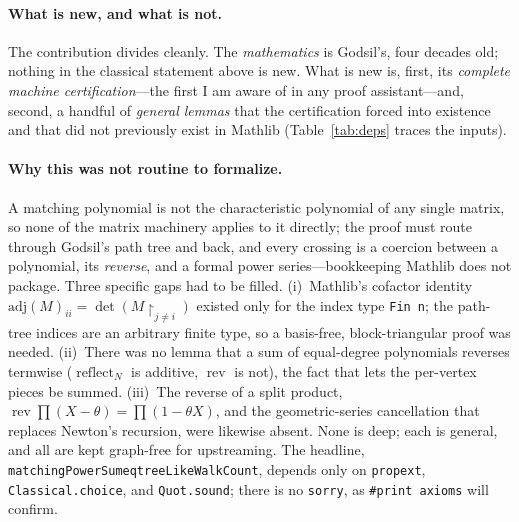 \documentclass[11pt]{article}
\newcommand{\lean}[1]{{\def\_{\textunderscore\allowbreak}\texttt{#1}}}
\DeclareMathOperator{\reflect}{reflect}
\DeclareMathOperator{\rev}{rev}
\begin{document}
\paragraph{What is new, and what is not.} The contribution divides cleanly. The \emph{mathematics} is
Godsil's, four decades old; nothing in the classical statement above is new. What is new is, first,
its \emph{complete machine certification}---the first I am aware of in any proof assistant---and,
second, a handful of \emph{general lemmas} that the certification forced into existence and that did
not previously exist in Mathlib (Table~\ref{tab:deps} traces the inputs).

\paragraph{Why this was not routine to formalize.} A matching polynomial is not the characteristic
polynomial of any single matrix, so none of the matrix machinery applies to it directly; the proof
must route through Godsil's path tree and back, and every crossing is a coercion between a polynomial,
its \emph{reverse}, and a formal power series---bookkeeping Mathlib does not package. Three specific
gaps had to be filled. (i)~Mathlib's cofactor identity $\mathrm{adj}(M)_{ii}=\det(M\!\restriction_{j\neq
i})$ existed only for the index type \lean{Fin\,n}; the path-tree indices are an arbitrary finite type,
so a basis-free, block-triangular proof was needed. (ii)~There was no lemma that a sum of equal-degree
polynomials reverses termwise ($\reflect_N$ is additive, $\rev$ is not), the fact that lets the
per-vertex pieces be summed. (iii)~The reverse of a split product, $\rev\prod(X-\theta)=\prod(1-\theta
X)$, and the geometric-series cancellation that replaces Newton's recursion, were likewise absent. None
is deep; each is general, and all are kept graph-free for upstreaming. The headline,
\lean{matchingPowerSum\_eq\_treeLikeWalkCount}, depends only on \lean{propext},
\lean{Classical.choice}, and \lean{Quot.sound}; there is no \lean{sorry}, as \lean{\#print axioms}
will confirm.
\end{document}
